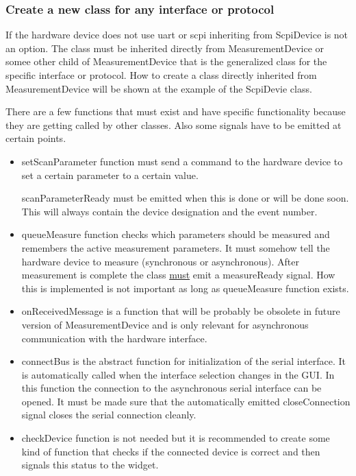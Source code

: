 \subsubsection{Create a new class for any interface or protocol}
If the hardware device does not use uart or scpi inheriting from ScpiDevice is not an option. The class must be inherited directly from MeasurementDevice or somee other child of MeasurementDevice that is the generalized class for the specific interface or protocol. How to create a class directly inherited from MeasurementDevice will be shown at the example of the ScpiDevie class.
\par\bigskip
There are a few functions that must exist and have specific functionality because they are getting called by other classes. Also some signals have to be emitted at certain points.
\par\bigskip
\begin{itemize}
	\item setScanParameter function must send a command to the hardware device to set a certain parameter to a certain value.
	
	scanParameterReady must be emitted when this is done or will be done soon. This will always contain the device designation and the event number.
	\par\bigskip
	\item queueMeasure function checks which parameters should be measured and remembers the active measurement parameters. It must somehow tell the hardware device to measure (synchronous or asynchronous). After measurement is complete the class \underline{must} emit a measureReady signal. How this is implemented is not important as long as queueMeasure function exists.
	
	\par\bigskip
	\item onReceivedMessage is a function that will be probably be obsolete in future version of MeasurementDevice and is only relevant for asynchronous communication with the hardware interface.
	\par\bigskip
	\item connectBus is the abstract function for initialization of the serial interface. It is automatically called when the interface selection changes in the GUI. In this function the connection to the asynchronous serial interface can be opened. It must be made sure that the automatically emitted closeConnection signal closes the serial connection cleanly.
	
	\par\bigskip
	\item checkDevice function is not needed but it is recommended to create some kind of function that checks if the connected device is correct and then signals this status to the widget.
	
\end{itemize}
